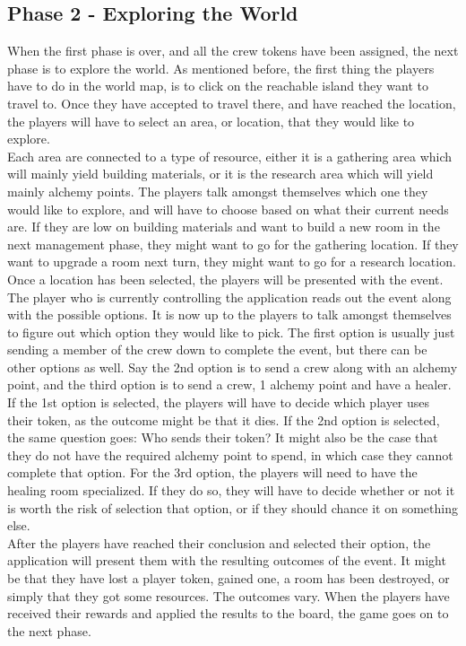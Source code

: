 \subsection{Phase 2 - Exploring the World}
When the first phase is over, and all the crew tokens have been assigned, the next phase is to explore the world.
As mentioned before, the first thing the players have to do in the world map, is to click on the reachable island they want to travel to. Once they have accepted to travel there, and have reached the location, the players will have to select an area, or location, that they would like to explore.\\
Each area are connected to a type of resource, either it is a gathering area which will mainly yield building materials, or it is the research area which will yield mainly alchemy points.
The players talk amongst themselves which one they would like to explore, and will have to choose based on what their current needs are. If they are low on building materials and want to build a new room in the next management phase, they might want to go for the gathering location. If they want to upgrade a room next turn, they might want to go for a research location.\\
Once a location has been selected, the players will be presented with the event.
The player who is currently controlling the application reads out the event along with the possible options.
It is now up to the players to talk amongst themselves to figure out which option they would like to pick. The first option is usually just sending a member of the crew down to complete the event, but there can be other options as well. Say the 2nd option is to send a crew along with an alchemy point, and the third option is to send a crew, 1 alchemy point and have a healer. 
If the 1st option is selected, the players will have to decide which player uses their token, as the outcome might be that it dies.
If the 2nd option is selected, the same question goes: Who sends their token? It might also be the case that they do not have the required alchemy point to spend, in which case they cannot complete that option.
For the 3rd option, the players will need to have the healing room specialized. If they do so, they will have to decide whether or not it is worth the risk of selection that option, or if they should chance it on something else.\\
After the players have reached their conclusion and selected their option, the application will present them with the resulting outcomes of the event. It might be that they have lost a player token, gained one, a room has been destroyed, or simply that they got some resources. The outcomes vary.
When the players have received their rewards and applied the results to the board, the game goes on to the next phase.

